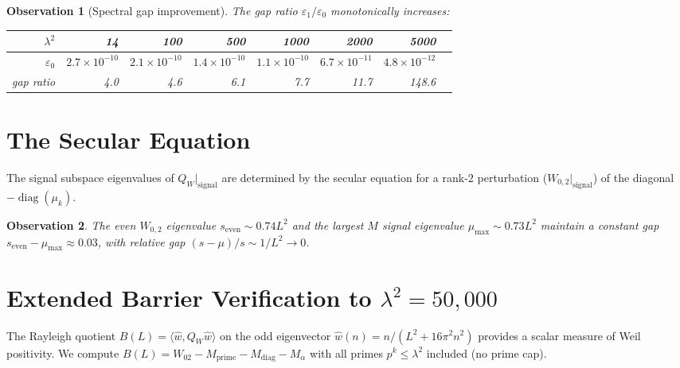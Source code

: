 \documentclass[11pt,a4paper]{article}
\newtheorem{observation}{Observation}[section]
\begin{document}
\begin{observation}[Spectral gap improvement]
The gap ratio $\varepsilon_1/\varepsilon_0$ monotonically increases:

\begin{center}
\begin{tabular}{rrrrrrrr}
\toprule
$\lambda^2$ & 14 & 100 & 500 & 1000 & 2000 & 5000 \\
\midrule
$\varepsilon_0$ & $2.7{\times}10^{-10}$ & $2.1{\times}10^{-10}$ & $1.4{\times}10^{-10}$ & $1.1{\times}10^{-10}$ & $6.7{\times}10^{-11}$ & $4.8{\times}10^{-12}$ \\
gap ratio & 4.0 & 4.6 & 6.1 & 7.7 & 11.7 & 148.6 \\
\bottomrule
\end{tabular}
\end{center}
\end{observation}

\section{The Secular Equation}

The signal subspace eigenvalues of $Q_W|_{\mathrm{signal}}$ are determined by the secular equation for a rank-$2$ perturbation ($W_{0,2}|_{\mathrm{signal}}$) of the diagonal $-\operatorname{diag}(\mu_k)$.

\begin{observation}
The even $W_{0,2}$ eigenvalue $s_{\mathrm{even}} \sim 0.74 L^2$ and the largest $M$ signal eigenvalue $\mu_{\max} \sim 0.73 L^2$ maintain a constant gap $s_{\mathrm{even}} - \mu_{\max} \approx 0.03$, with relative gap $(s-\mu)/s \sim 1/L^2 \to 0$.
\end{observation}

\section{Extended Barrier Verification to $\lambda^2 = 50{,}000$}

The Rayleigh quotient $B(L) = \langle \hat{w}, Q_W \hat{w} \rangle$ on the odd eigenvector $\hat{w}(n) = n/(L^2 + 16\pi^2 n^2)$ provides a scalar measure of Weil positivity. We compute $B(L) = W_{02} - M_{\mathrm{prime}} - M_{\mathrm{diag}} - M_\alpha$ with all primes $p^k \le \lambda^2$ included (no prime cap).
\end{document}
